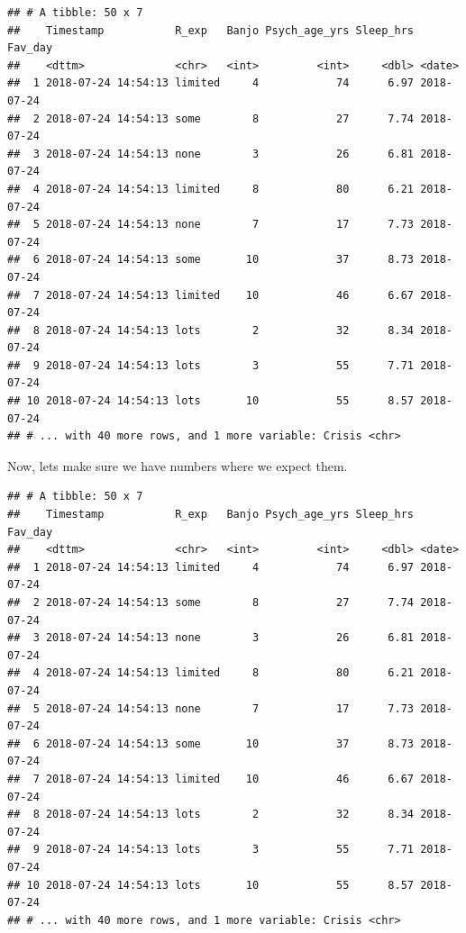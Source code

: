 \documentclass[]{article}
\newenvironment{Shaded}{\begin{snugshade}}{\end{snugshade}}
\newcommand{\KeywordTok}[1]{\textcolor[rgb]{0.13,0.29,0.53}{\textbf{#1}}}
\newcommand{\StringTok}[1]{\textcolor[rgb]{0.31,0.60,0.02}{#1}}
\newcommand{\OperatorTok}[1]{\textcolor[rgb]{0.81,0.36,0.00}{\textbf{#1}}}
\newcommand{\NormalTok}[1]{#1}
\begin{document}
\begin{verbatim}
## # A tibble: 50 x 7
##    Timestamp           R_exp   Banjo Psych_age_yrs Sleep_hrs Fav_day   
##    <dttm>              <chr>   <int>         <int>     <dbl> <date>    
##  1 2018-07-24 14:54:13 limited     4            74      6.97 2018-07-24
##  2 2018-07-24 14:54:13 some        8            27      7.74 2018-07-24
##  3 2018-07-24 14:54:13 none        3            26      6.81 2018-07-24
##  4 2018-07-24 14:54:13 limited     8            80      6.21 2018-07-24
##  5 2018-07-24 14:54:13 none        7            17      7.73 2018-07-24
##  6 2018-07-24 14:54:13 some       10            37      8.73 2018-07-24
##  7 2018-07-24 14:54:13 limited    10            46      6.67 2018-07-24
##  8 2018-07-24 14:54:13 lots        2            32      8.34 2018-07-24
##  9 2018-07-24 14:54:13 lots        3            55      7.71 2018-07-24
## 10 2018-07-24 14:54:13 lots       10            55      8.57 2018-07-24
## # ... with 40 more rows, and 1 more variable: Crisis <chr>
\end{verbatim}

Now, lets make sure we have numbers where we expect them.

\begin{Shaded}
\end{Shaded}

\begin{verbatim}
## # A tibble: 50 x 7
##    Timestamp           R_exp   Banjo Psych_age_yrs Sleep_hrs Fav_day   
##    <dttm>              <chr>   <int>         <int>     <dbl> <date>    
##  1 2018-07-24 14:54:13 limited     4            74      6.97 2018-07-24
##  2 2018-07-24 14:54:13 some        8            27      7.74 2018-07-24
##  3 2018-07-24 14:54:13 none        3            26      6.81 2018-07-24
##  4 2018-07-24 14:54:13 limited     8            80      6.21 2018-07-24
##  5 2018-07-24 14:54:13 none        7            17      7.73 2018-07-24
##  6 2018-07-24 14:54:13 some       10            37      8.73 2018-07-24
##  7 2018-07-24 14:54:13 limited    10            46      6.67 2018-07-24
##  8 2018-07-24 14:54:13 lots        2            32      8.34 2018-07-24
##  9 2018-07-24 14:54:13 lots        3            55      7.71 2018-07-24
## 10 2018-07-24 14:54:13 lots       10            55      8.57 2018-07-24
## # ... with 40 more rows, and 1 more variable: Crisis <chr>
\end{verbatim}
\end{document}
